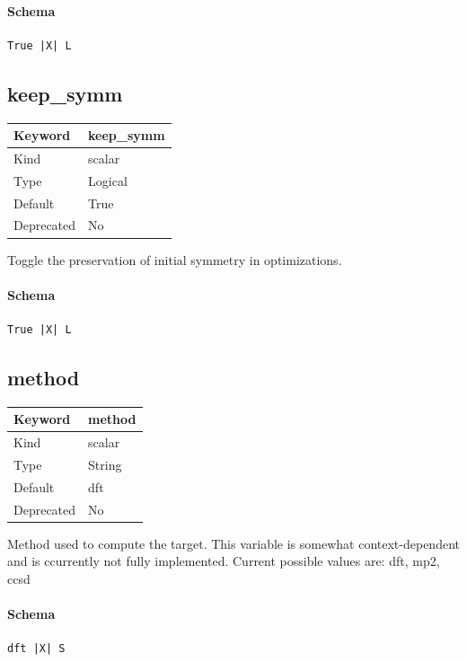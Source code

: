 \documentclass[11pt]{article}
\begin{document}
\paragraph{Schema}
\begin{Verbatim}
True |X| L
\end{Verbatim}

\subsection{keep\_symm}
\label{kw:keep-symm}
\begin{longtable}{|p{1.5in}|p{4.5in}|}
\hline
Keyword & keep\_symm \\
\hline
Kind & scalar \\
\hline
Type & Logical \\
\hline
Default & True \\
\hline
Deprecated & No \\
\hline
\end{longtable}
 Toggle the preservation of initial symmetry in optimizations.

\paragraph{Schema}
\begin{Verbatim}
True |X| L
\end{Verbatim}

\subsection{method}
\label{kw:method}
\begin{longtable}{|p{1.5in}|p{4.5in}|}
\hline
Keyword & method \\
\hline
Kind & scalar \\
\hline
Type & String \\
\hline
Default & dft \\
\hline
Deprecated & No \\
\hline
\end{longtable}
 Method used to compute the target. This variable is somewhat context-dependent
 and is ccurrently not fully implemented.
 Current possible values are:
    dft, mp2, ccsd

\paragraph{Schema}
\begin{Verbatim}
dft |X| S
\end{Verbatim}
\end{document}
